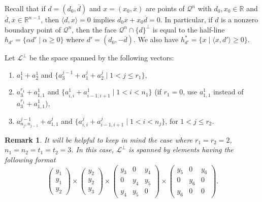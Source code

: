 \documentclass{article}
\newcommand{\SOC}[1]{{\mathcal{Q}^{#1}}}
\newcommand{\inProd}[2]{\langle #1 , #2 \rangle }
\newcommand{\stdSpace}{ \mathcal{L}}
\renewcommand{\Re}{\mathbb{R}}
\newtheorem*{remark}{Remark}
\begin{document}
Recall that if $d = (d_0,\overline{d})$ and $x = (x_0,\overline{x})$ are points 
of $\SOC{n}$ with $d_0,x_0 \in \Re$ and $\overline{d},\overline{x} \in \Re^{n-1}$, then 
$\inProd{d}{x} = 0$ implies  $d_0\overline{x} + x_0\overline{d} = 0 $. In particular, if 
$d$ is a nonzero boundary point of $\SOC{n}$, then the face $\SOC{n} \cap \{d\}^\perp$ is 
equal to the half-line $h_{d'} = \{\alpha d' \mid \alpha \geq 0 \}$ where 
$d' = (d_0,-\overline{d})$. We also have $h_{d'}^* = \{x \mid \inProd{x}{d'} \geq 0 \} $.

Let $\stdSpace ^\perp$ be the space spanned by the following vectors:
\begin{enumerate}
	\item $a^1_{1} + a^1_{2}$ and $\{a^{j-1}_3 + a^j_{1} + a^j_{2} \mid 1 < j \leq r_1\}$,
	\item $a^{r_1}_3 + a^1_{1,1}$ and  $\{a^{1}_{i,i} + a^{1}_{i-1,i+1}  \mid 1 < i < n_1\}$ (if $r_1 = 0$, use $a^1_{1,1}$ instead of  $a^{r_1}_3 + a^1_{1,1}$),
	\item $a^{j-1}_{n_j,n_{j-1}} + a^j_{1,1}$ and  $\{a^{j}_{i,i} + a^{j}_{i-1,i+1}  \mid 1 < i < n_j\}$, for $1 < j \leq r_2$.
\end{enumerate}

\begin{remark}
It will be helpful  to keep in mind the case where $r_1 = r_2 = 2$, $n_1 = n_2 = t_1 = t_2 = 3$.
In this case, $\stdSpace ^\perp$ is spanned by elements having the following format
	\begin{equation*}
	\begin{pmatrix}y_1 \\ y_1 \\ y_2 \end{pmatrix} \times \begin{pmatrix}y_2 \\ y_2 \\ y_3 \end{pmatrix} \times 
	\begin{pmatrix}y_3 & 0 & y_4 \\ 0 & y_4 & y_5 \\ y_4 & y_5 & 0  \end{pmatrix} \times 
	\begin{pmatrix}y_5 & 0 & y_6 \\ 0 & y_6 & 0 \\ y_6 & 0 & 0   \end{pmatrix}. 
	\end{equation*} 
\end{remark}
\end{document}
